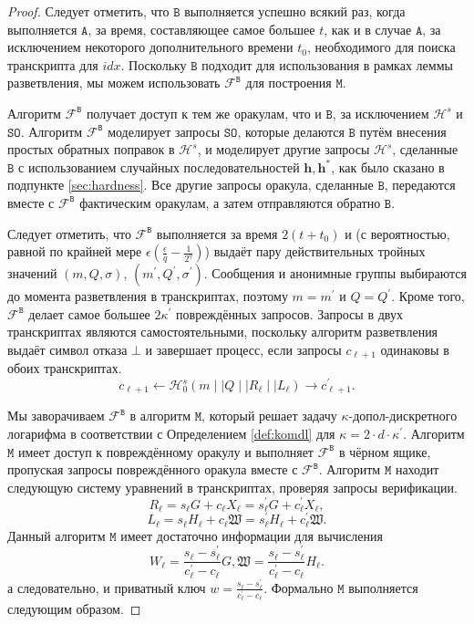 \documentclass{llncs}
\newcommand{\A}{\texttt{A}}
\newcommand{\B}{\texttt{B}}
\newcommand{\Hs}{\mathcal{H}^s}
\begin{document}
\begin{proof}
Следует отметить, что $\B$ выполняется успешно всякий раз, когда выполняется $\A$, за время, составляющее самое большее $t$, как и в случае $\A$, за исключением некоторого дополнительного времени $t_0$, необходимого для поиска транскрипта для $idx$. Поскольку $\B$ подходит для использования в рамках леммы разветвления, мы можем использовать $\mathcal{F}^{\B}$ для построения $\texttt{M}$.

Алгоритм $\mathcal{F}^{\B}$ получает доступ к тем же оракулам, что и $\B$, за исключением $\Hs$ и $\texttt{SO}$. Алгоритм $\mathcal{F}^{\B}$ моделирует запросы $\texttt{SO}$, которые делаются $\B$ путём внесения простых обратных поправок в $\Hs$, и моделирует другие запросы $\Hs$, сделанные $\B$ с использованием случайных последовательностей $\textbf{h}, \textbf{h}^*$, как было сказано в подпункте \ref{sec:hardness}. Все другие запросы оракула, сделанные $\B$, передаются вместе с $\mathcal{F}^{\B}$ фактическим оракулам, а затем отправляются обратно $\B$.

Следует отметить, что $\mathcal{F}^{\B}$ выполняется за время $2(t+t_0)$ и (с вероятностью, равной по крайней мере $\epsilon\left(\frac{\epsilon}{q} - \frac{1}{2^\eta}\right)$) выдаёт пару действительных тройных значений $(m, Q, \sigma)$, $(m^\prime, Q^\prime, \sigma^\prime)$. Сообщения и анонимные группы выбираются до момента разветвления в транскриптах, поэтому $m=m^\prime$ и $Q=Q^\prime$. Кроме того, $\mathcal{F}^{\B}$ делает самое большее $2\kappa^\prime$ повреждённых запросов. Запросы в двух транскриптах являются самостоятельными, поскольку алгоритм разветвления выдаёт символ отказа $\bot$ и завершает процесс, если запросы $c_{\ell + 1}$ одинаковы в обоих транскриптах.
\[c_{\ell + 1} \leftarrow \Hs_0(m \mid \mid Q \mid \mid R_\ell \mid \mid L_\ell) \rightarrow c_{\ell+1}^\prime.\]

Мы заворачиваем $\mathcal{F}^{\B}$ в алгоритм $\texttt{M}$, который решает задачу $\kappa$-допол- дискретного логарифма в соответствии с Определением \ref{def:komdl} для $\kappa = 2\cdot d \cdot \kappa^\prime$. Алгоритм $\texttt{M}$ имеет доступ к повреждённому оракулу и выполняет $\mathcal{F}^{\B}$ в чёрном ящике, пропуская запросы повреждённого оракула вместе с $\mathcal{F}^{\B}$. Алгоритм $\texttt{M}$ находит следующую систему уравнений в транскриптах, проверяя запросы верификации.
\[R_\ell = s_\ell G + c_\ell X_\ell = s_\ell^\prime G + c_\ell^\prime X_\ell,\]
\[L_\ell = s_\ell H_\ell + c_\ell \mathfrak{W} = s_\ell^\prime H_\ell + c_\ell^\prime \mathfrak{W}.\] Данный алгоритм $\texttt{M}$ имеет достаточно информации для вычисления
\[ W_\ell = \frac{s_\ell - s_\ell^\prime}{c_\ell^\prime - c_\ell} G,  \mathfrak{W} = \frac{s_\ell - s_\ell^\prime}{c_\ell^\prime - c_\ell} H_\ell.\]
а следовательно, и приватный ключ $w = \frac{s_{\ell} - s_\ell^\prime}{c_\ell^\prime - c_\ell}$. Формально $\texttt{M}$ выполняется следующим образом.


\end{proof}
\end{document}
